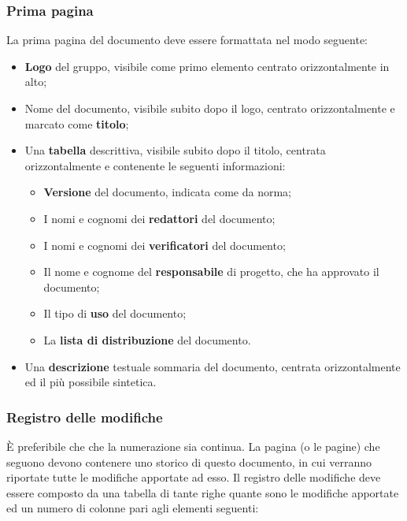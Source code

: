	\subsubsection{Prima pagina}
	
	La prima pagina del documento deve essere formattata nel modo seguente:
	
	\begin{itemize}
	
		\item \textbf{Logo} del gruppo, visibile come primo elemento centrato orizzontalmente in alto;
		\item Nome del documento, visibile subito dopo il logo, centrato orizzontalmente e marcato come \textbf{titolo};
		\item Una \textbf{tabella} descrittiva, visibile subito dopo il titolo, centrata orizzontalmente e contenente le seguenti informazioni:
			\begin{itemize}
			
				\item \textbf{Versione} del documento, indicata come da norma;
				\item I nomi e cognomi dei \textbf{redattori} del documento;
				\item I nomi e cognomi dei \textbf{verificatori} del documento;
				\item Il nome e cognome del \textbf{responsabile} di progetto, che ha approvato il documento;
				\item Il tipo di \textbf{uso} del documento;
				\item La \textbf{lista di distribuzione} del documento.
			
			\end{itemize}
		\item Una \textbf{descrizione} testuale sommaria del documento, centrata orizzontalmente ed il più possibile sintetica.
	
	\end{itemize}
	
	\subsubsection{Registro delle modifiche}
È preferibile che che la numerazione sia continua. La pagina (o le pagine) che seguono devono contenere uno storico di questo documento, in cui verranno riportate tutte le modifiche apportate ad esso. Il registro delle modifiche deve essere composto da una tabella di tante righe quante sono le modifiche apportate ed un numero di colonne pari agli elementi seguenti:
	
